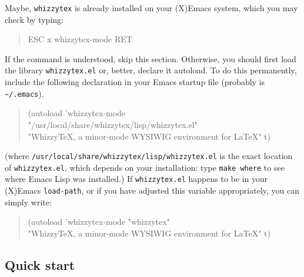\documentclass[12pt]{article}
\let \lst \verb
\begin{document}
Maybe, {\tt whizzytex} is already installed on your (X)Emacs system, which
you may check by typing:
\begin{quote}
\begin{tt}
ESC x whizzytex-mode RET
\end{tt}
\end{quote}
If the command is understood, skip this section.
Otherwise, you should first load the library \lst"whizzytex.el" or, better,
declare it autoload. To do this permanently, include the following
declaration in your Emacs startup file (probably is \lst"~/.emacs").
\begin{quote}\small
\begin{tt}
(autoload 'whizzytex-mode \\ \indent\obeyspaces
    "/usr/local/share/whizzytex/lisp/whizzytex.el" \\ \indent\obeyspaces
    "WhizzyTeX, a minor-mode WYSIWIG environment for LaTeX" t)
\end{tt}
\end{quote}
(where \lst"/usr/local/share/whizzytex/lisp/whizzytex.el" is the exact
location of \lst"whizzytex.el", which depends on your installation: type
{\tt make where} to see where Emacs Lisp was installed.)  If
\lst"whizzytex.el" happens to be in your (X)Emacs {\tt load-path}, or if you
have adjusted this variable appropriately, you can simply write:
\begin{quote}\small
\begin{tt}
(autoload 'whizzytex-mode "whizzytex" \\ \indent \obeyspaces
    "WhizzyTeX, a minor-mode WYSIWIG environment for LaTeX" t)
\end{tt}
\end{quote}

\subsection {Quick start} 
\end{document}
